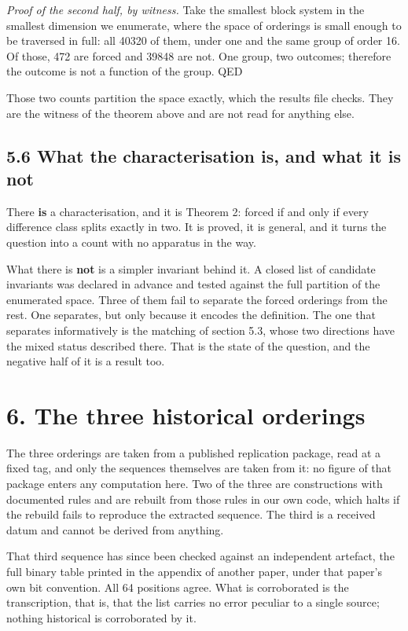\documentclass[11pt,a4paper]{article}
\begin{document}
\emph{Proof of the second half, by witness.} Take the smallest block system in the smallest dimension we enumerate, where the space of orderings is small enough to be traversed in full: all 40320 of them, under one and the same group of order 16. Of those, 472 are forced and 39848 are not. One group, two outcomes; therefore the outcome is not a function of the group. QED

Those two counts partition the space exactly, which the results file checks. They are the witness of the theorem above and are not read for anything else.

\subsection*{5.6 What the characterisation is, and what it is not}

There \textbf{is} a characterisation, and it is Theorem 2: forced if and only if every difference class splits exactly in two. It is proved, it is general, and it turns the question into a count with no apparatus in the way.

What there is \textbf{not} is a simpler invariant behind it. A closed list of candidate invariants was declared in advance and tested against the full partition of the enumerated space. Three of them fail to separate the forced orderings from the rest. One separates, but only because it encodes the definition. The one that separates informatively is the matching of section 5.3, whose two directions have the mixed status described there. That is the state of the question, and the negative half of it is a result too.

\section*{6. The three historical orderings}

The three orderings are taken from a published replication package, read at a fixed tag, and only the sequences themselves are taken from it: no figure of that package enters any computation here. Two of the three are constructions with documented rules and are rebuilt from those rules in our own code, which halts if the rebuild fails to reproduce the extracted sequence. The third is a received datum and cannot be derived from anything.

That third sequence has since been checked against an independent artefact, the full binary table printed in the appendix of another paper, under that paper's own bit convention. All 64 positions agree. What is corroborated is the transcription, that is, that the list carries no error peculiar to a single source; nothing historical is corroborated by it.
\end{document}
